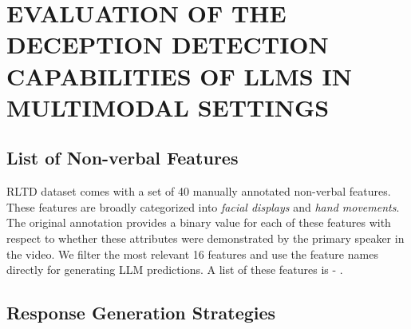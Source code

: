 
\chapter{\uppercase{EVALUATION OF THE DECEPTION DETECTION CAPABILITIES OF LLMS IN
MULTIMODAL SETTINGS}}


\section{List of Non-verbal Features}
\label{non-verbal}
RLTD dataset comes with a set of 40 manually annotated non-verbal features. These features are broadly categorized into \textit{facial displays} and \textit{hand movements}. The original annotation provides a binary value for each of these features with respect to whether these attributes were demonstrated by the primary speaker in the video. We filter the most relevant 16 features and use the feature names directly for generating LLM predictions. A list of these features is - .

\section{Response Generation Strategies}
\label{reasoning gen}



